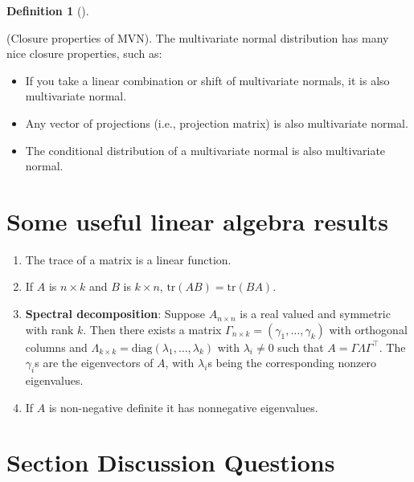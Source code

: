 \documentclass[
  letterpaper,
  DIV=11,
  numbers=noendperiod]{scrreprt}
\theoremstyle{definition}
\newtheorem{definition}{Definition}[chapter]
\theoremstyle{plain}
\theoremstyle{remark}
\begin{document}
\leavevmode{}%
\begin{definition}[]\label{def-closure}

(Closure properties of MVN). The multivariate normal distribution has
many nice closure properties, such as:

\begin{itemize}
\item
  If you take a linear combination or shift of multivariate normals, it
  is also multivariate normal.
\item
  Any vector of projections (i.e., projection matrix) is also
  multivariate normal.
\item
  The conditional distribution of a multivariate normal is also
  multivariate normal.
\end{itemize}

\end{definition}

\hypertarget{some-useful-linear-algebra-results}{%
\section*{Some useful linear algebra
results}\label{some-useful-linear-algebra-results}}


\begin{enumerate}
\def\labelenumi{\arabic{enumi}.}
\item
  The trace of a matrix is a linear function.
\item
  If \(A\) is \(n\times k\) and \(B\) is \(k\times n\),
  \(\mbox{tr}(AB)=\mbox{tr}(BA)\).
\item
  \textbf{Spectral decomposition}: Suppose \(A_{n\times n}\) is a real
  valued and symmetric with rank \(k\). Then there exists a matrix
  \(\Gamma_{n\times k}=(\gamma_{1},\dots,\gamma_{k})\) with orthogonal
  columns and
  \(\Lambda_{k \times k}=\mbox{{diag}}(\lambda_{1},\dots,\lambda_{k})\)
  with \(\lambda_{i}\neq0\) such that \(A=\Gamma\Lambda\Gamma^{\top}\).
  The \(\gamma_{i}\)s are the eigenvectors of \(A\), with
  \(\lambda_{i}\)s being the corresponding nonzero eigenvalues.
\item
  If \(A\) is non-negative definite it has nonnegative eigenvalues.
\end{enumerate}

\hypertarget{section-discussion-questions-5}{%
\section*{Section Discussion
Questions}\label{section-discussion-questions-5}}
\end{document}
